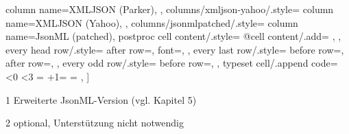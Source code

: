 \begin{threeparttable}
{        column name=XMLJSON (Parker),
    },
    columns/xmljson-yahoo/.style={
        column name=XMLJSON (Yahoo),
    },
    columns/jsonmlpatched/.style={
        column name={JsonML (patched)},
        postproc cell content/.style={%
            @cell content/.add={
               }{}
        },
    },
    every head row/.style={
        after row=\toprule,
        font=\selectfont,
    },
    every last row/.style={
        before row=\midrule,
        after row=\bottomrule,
    },
    every odd row/.style={
        before row={},
    },
    typeset cell/.append code={%
        \ifnum\pgfplotstablerow<0%
            \ifnum\pgfplotstablecol<3
            \else
                \ifnum\pgfplotstablecol=\pgfplotstablecols
                \else
                \fi
            \fi
        \fi
        \ifnum\numexpr\pgfplotstablerow+1=\pgfplotstablerows
            \ifnum\pgfplotstablecol=\pgfplotstablecols
            \else
            \fi
        \fi
    },
]\loadedtable
    \begin{tablenotes}
        \item[1] Erweiterte JsonML-Version (vgl. Kapitel 5)
        \ifx\hasfootnote\undefined
        \else
    \item[2] optional, Unterst{\"u}tzung nicht notwendig
        \fi
    \end{tablenotes}
  \end{threeparttable}\hspace{2.2em}

